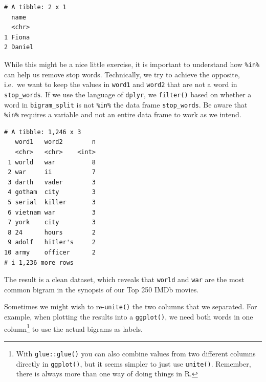 \documentclass[
  letterpaper,
]{krantz}
\makeatletter
\newenvironment{Shaded}{\begin{snugshade}}{\end{snugshade}}
\newcommand{\AttributeTok}[1]{\textcolor[rgb]{0.40,0.45,0.13}{#1}}
\newcommand{\ConstantTok}[1]{\textcolor[rgb]{0.56,0.35,0.01}{#1}}
\newcommand{\FunctionTok}[1]{\textcolor[rgb]{0.28,0.35,0.67}{#1}}
\newcommand{\NormalTok}[1]{\textcolor[rgb]{0.00,0.23,0.31}{#1}}
\newcommand{\OtherTok}[1]{\textcolor[rgb]{0.00,0.23,0.31}{#1}}
\newcommand{\SpecialCharTok}[1]{\textcolor[rgb]{0.37,0.37,0.37}{#1}}
\newenvironment{kframe}{%
\medskip{}
\setlength{\fboxsep}{.8em}
 \def\at@end@of@kframe{}%
 \ifinner\ifhmode%
  \def\at@end@of@kframe{\end{minipage}}%
  \begin{minipage}{\columnwidth}%
 \fi\fi%
 \def\FrameCommand##1{\hskip\@totalleftmargin \hskip-\fboxsep
 \colorbox{shadecolor}{##1}\hskip-\fboxsep
     \hskip-\linewidth \hskip-\@totalleftmargin \hskip\columnwidth}%
 \MakeFramed {\advance\hsize-\width
   \@totalleftmargin\z@ \linewidth\hsize
   \@setminipage}}%
 {\par\unskip\endMakeFramed%
 \at@end@of@kframe}
\renewenvironment{Shaded}{\begin{kframe}}{\end{kframe}}
\makeatother
\begin{document}
\begin{verbatim}
# A tibble: 2 x 1
  name  
  <chr> 
1 Fiona 
2 Daniel
\end{verbatim}

While this might be a nice little exercise, it is important to
understand how \texttt{\%in\%} can help us remove stop words.
Technically, we try to achieve the opposite, i.e.~we want to keep the
values in \texttt{word1} and \texttt{word2} that are not a word in
\texttt{stop\_words}. If we use the language of \texttt{dplyr}, we
\texttt{filter()} based on whether a word in \texttt{bigram\_split} is
not \texttt{\%in\%} the data frame \texttt{stop\_words}. Be aware that
\texttt{\%in\%} requires a variable and not an entire data frame to work
as we intend.

\begin{Shaded}
\end{Shaded}

\begin{verbatim}
# A tibble: 1,246 x 3
   word1   word2        n
   <chr>   <chr>    <int>
 1 world   war          8
 2 war     ii           7
 3 darth   vader        3
 4 gotham  city         3
 5 serial  killer       3
 6 vietnam war          3
 7 york    city         3
 8 24      hours        2
 9 adolf   hitler's     2
10 army    officer      2
# i 1,236 more rows
\end{verbatim}

The result is a clean dataset, which reveals that \texttt{world} and
\texttt{war} are the most common bigram in the synopsis of our Top 250
IMDb movies.

Sometimes we might wish to re-\texttt{unite()} the two columns that we
separated. For example, when plotting the results into a
\texttt{ggplot()}, we need both words in one column\footnote{With
  \texttt{glue::glue()} you can also combine values from two different
  columns directly in \texttt{ggplot()}, but it seems simpler to just
  use \texttt{unite()}. Remember, there is always more than one way of
  doing things in R.} to use the actual bigrams as labels.
\end{document}
